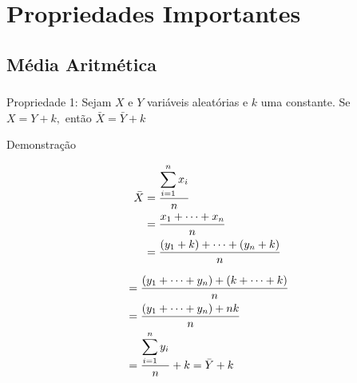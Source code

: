 \documentclass[14pt,aspectratio=1610]{beamer}
\begin{document}
\section{Propriedades Importantes}
\subsection{Média Aritmética}
\begin{frame}{}
	\frametitle{}
	\begin{block}{Propriedade 1:}
		\justifying
		Sejam $X$ e $Y$ variáveis aleatórias e $k$ uma constante. Se $X=Y+k,$ então $\bar{X}=\bar{Y}+k$
	\end{block}
	\pause
	\begin{block}{Demonstração}
		\begin{minipage}{0.4\textwidth}
			\begin{align*}
				\bar{X}&=\dfrac{{\displaystyle \sum_{i=1}^{n}x_{i}}}{n}\\ 
				\vspace{0.1cm}
				&=\dfrac{x_{1}+\cdots+x_{n}}{n}\\ \vspace{0.1cm}
				&=\dfrac{(y_{1}+k)+\cdots+(y_{n}+k)}{n}\\
			\end{align*}
		\end{minipage}\pause\hfill
		\begin{minipage}{0.4\textwidth}
			\begin{align*}
				&=\dfrac{(y_{1}+\cdots+y_{n})+
					(k+\cdots+k)}{n}\\ \vspace{0.1cm}
				&=\dfrac{(y_{1}+\cdots+y_{n})+
					nk}{n}\\ \vspace{0.1cm}
				&=\dfrac{{\displaystyle \sum_{i=1}^{n}y_{i}}}{n}+k=\bar{Y}+k
			\end{align*}
		\end{minipage}
	\end{block}
\end{frame}
\end{document}
